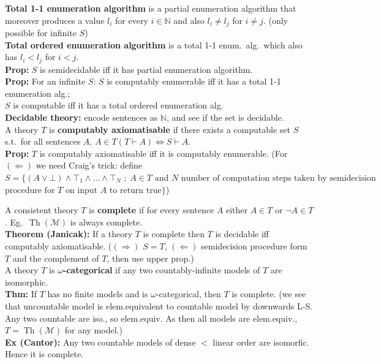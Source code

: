 \documentclass[a4paper,oneside,12pt]{article}
\theoremstyle{definition}
\newcommand{\N}{\ensuremath{\mathbb{N}}}
\newcommand{\M}{\ensuremath{\mathcal{M}}}
\DeclareMathOperator{\Th}{Th}
\begin{document}
\textbf{Total 1-1 enumeration algorithm} is a partial enumeration algorithm that moreover produces a value $l_i$ for every $i \in \N$ and also $l_i \neq l_j$ for $i \neq j$. (only possible for infinite $S$)\\
\textbf{Total ordered enumeration algorithm} is a total 1-1 enum.\ alg.\ which also has $l_i < l_j$ for $i < j$.\\
\textbf{Prop: }$S$ is semidecidable iff it has partial enumeration algorithm.\\
\textbf{Prop: }For an infinite $S$: $S$ is computably enumerable iff it has a total 1-1 enumeration alg.; \\$S$ is computable iff it has a total ordered enumeration alg.\\
\textbf{Decidable theory: }encode sentences as $\N$, and see if the set is decidable.\\
A theory $T$ is \textbf{computably axiomatisable} if there exists a computable set $S$ s.t.\ for all sentences $A$, $A \in T (T \vdash A) \iff S \vdash A$.\\
\textbf{Prop: }$T$ is computably axiomatisable iff it is computably enumerable. (For $(\Leftarrow)$ we need Craig's trick: define $S = \{(A \vee \bot) \wedge \top_1 \wedge \ldots \wedge \top_N \; ; \; A \in T \text{ and } N \text{ number of computation steps taken by semidecision}$\\$\text{procedure for }T \text{ on input }A \text{ to return true}\}$)

A consistent theory $T$ is \textbf{complete} if for every sentence $A$ either $A \in T$ or $\neg A \in T$. Eg.\ $\Th(\M)$ is always complete.\\
\textbf{Theorem (Janicak): }If a theory $T$ is complete then $T$ is decidable iff computably axiomatisable. ($(\Rightarrow)$ $S = T$, $(\Leftarrow)$ semidecision procedure form $T$ and the complement of $T$, then use upper prop.)\\
A theory $T$ is \textbf{$\omega$-categorical} if any two countably-infinite models of $T$ are isomorphic.\\
\textbf{Thm: }If $T$ has no finite models and is $\omega$-categorical, then $T$ is complete. (we see that uncountable model is elem.equivalent to countable model by downwards L-S. Any two countable are iso., so elem.equiv. As then all models are elem.equiv., $T = \Th(\M)$ for any model.)\\
\textbf{Ex (Cantor): }Any two countable models of dense $<$ linear order are isomorfic. Hence it is complete.
\end{document}

